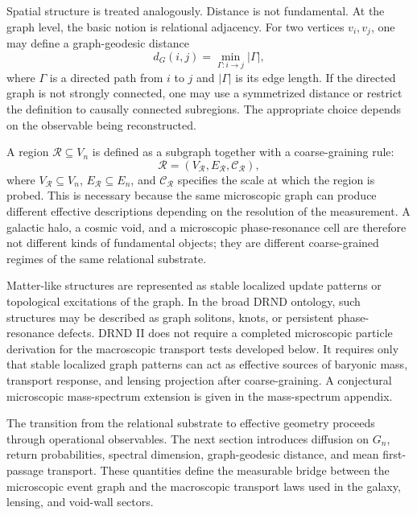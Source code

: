 \documentclass[12pt]{iopart}
\begin{document}
Spatial structure is treated analogously. Distance is not fundamental. At the graph level, the basic notion is relational adjacency. For two vertices \(v_i,v_j\), one may define a graph-geodesic distance
\begin{equation}
d_G(i,j)
=
\min_{\Gamma:i\to j} |\Gamma|,
\end{equation}
where \(\Gamma\) is a directed path from \(i\) to \(j\) and \(|\Gamma|\) is its edge length. If the directed graph is not strongly connected, one may use a symmetrized distance or restrict the definition to causally connected subregions. The appropriate choice depends on the observable being reconstructed.

A region \(\mathcal{R}\subseteq V_n\) is defined as a subgraph together with a coarse-graining rule:
\begin{equation}
\mathcal{R}
=
(V_{\mathcal{R}},E_{\mathcal{R}},\mathcal{C}_{\mathcal{R}}),
\end{equation}
where \(V_{\mathcal{R}}\subseteq V_n\), \(E_{\mathcal{R}}\subseteq E_n\), and \(\mathcal{C}_{\mathcal{R}}\) specifies the scale at which the region is probed. This is necessary because the same microscopic graph can produce different effective descriptions depending on the resolution of the measurement. A galactic halo, a cosmic void, and a microscopic phase-resonance cell are therefore not different kinds of fundamental objects; they are different coarse-grained regimes of the same relational substrate.

Matter-like structures are represented as stable localized update patterns or topological excitations of the graph. In the broad DRND ontology, such structures may be described as graph solitons, knots, or persistent phase-resonance defects. DRND II does not require a completed microscopic particle derivation for the macroscopic transport tests developed below. It requires only that stable localized graph patterns can act as effective sources of baryonic mass, transport response, and lensing projection after coarse-graining. A conjectural microscopic mass-spectrum extension is given in the mass-spectrum appendix.

The transition from the relational substrate to effective geometry proceeds through operational observables. The next section introduces diffusion on \(G_n\), return probabilities, spectral dimension, graph-geodesic distance, and mean first-passage transport. These quantities define the measurable bridge between the microscopic event graph and the macroscopic transport laws used in the galaxy, lensing, and void-wall sectors.
\end{document}
